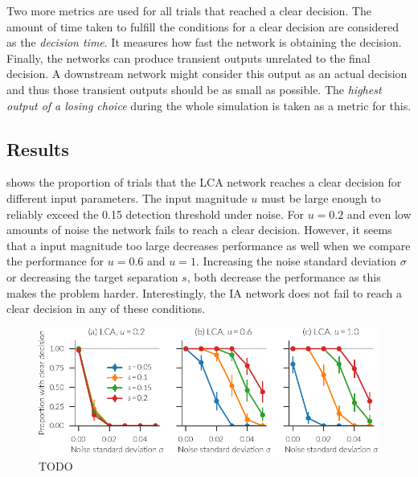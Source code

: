 Two more metrics are used for all trials that reached a clear decision.
The amount of time taken to fulfill the conditions for a clear decision are considered as the \emph{decision time}.
It measures how fast the network is obtaining the decision.
Finally, the networks can produce transient outputs unrelated to the final decision.
A downstream network might consider this output as an actual decision and thus those transient outputs should be as small as possible.
The \emph{highest output of a losing choice} during the whole simulation is taken as a metric for this.


\subsection{Results}
 shows the proportion of trials that the LCA network reaches a clear decision for different input parameters.
The input magnitude $u$ must be large enough to reliably exceed the \num{0.15} detection threshold under noise.
For $u = 0.2$ and even low amounts of noise the network fails to reach a clear decision.
However, it seems that a input magnitude too large decreases performance as well when we compare the performance for $u=0.6$ and $u=1$.
Increasing the noise standard deviation $\sigma$ or decreasing the target separation $s$, both decrease the performance as this makes the problem harder.
Interestingly, the IA network does not fail to reach a clear decision in any of these conditions.
\begin{figure}
    \centering
    \includegraphics{figures/ia-clear}
    \caption{TODO}\label{fig:ia-clear}
\end{figure}


